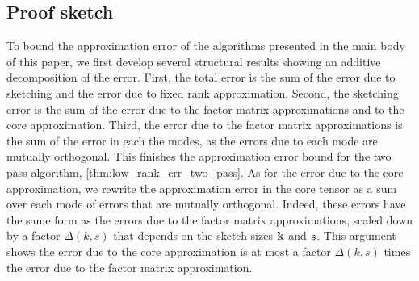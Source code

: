 \subsection{Proof sketch} To bound the approximation error of the algorithms presented in the main body
of this paper, we first develop several structural results showing
an additive decomposition of the error.
First, the total error is the sum of the error due to sketching
and the error due to fixed rank approximation.
Second, the sketching error is the sum of the error due to the factor matrix
approximations and to the core approximation.
Third, the error due to the factor matrix approximations
is the sum of the error in each the modes,
as the errors due to each mode are mutually orthogonal.
This finishes the approximation error bound for the two pass algorithm, \ref{thm:low_rank_err_two_pass}.
As for the error due to the core approximation,
we %
rewrite the approximation error in the core tensor
as a sum over each mode of errors that are mutually orthogonal.
Indeed, these errors have the same form as the errors due to the factor matrix approximations,
scaled down by a factor $\Delta(k,s)$ that depends on the sketch sizes $\mathbf{k}$ and $\mathbf{s}$.
This argument shows the error due to the core approximation
is at most a factor $\Delta(k,s)$ times the error due to the factor matrix approximation.
